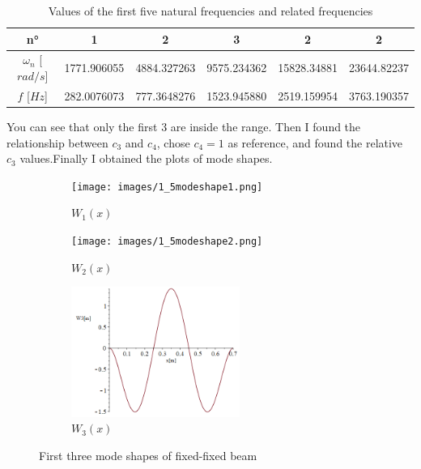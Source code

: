 \documentclass[11pt,a4paper]{article}
\begin{document}
\begin{enumerate}
	\begin{table}[H]
		\centering
		\begin{tabular}{c c c c c c} 
			\toprule
			\textbf{n°} & \textbf{1} & \textbf{2} & \textbf{3} & \textbf{2} & \textbf{2} \\
			\midrule	    		   	    		
			$\omega_n$ [$rad/s$] & 1771.906055 & 4884.327263 & 9575.234362 & 15828.34881 & 23644.82237 \\
			\midrule	    		
			$f$ [$Hz$]  & 282.0076073 & 777.3648276 & 1523.945880 & 2519.159954 & 3763.190357 \\	    		   
			\bottomrule
		\end{tabular}
		\caption{Values of the first five natural frequencies and related frequencies}
	\end{table}

	You can see that only the first 3 are inside the range. Then I found the relationship between $c_3$ and $c_4$, chose $c_4=1$ as reference, and found the relative $c_3$ values.Finally I obtained the plots of mode shapes.
	
	\begin{figure}[H]
		\centering
		\begin{subfigure}[b]{0.3\textwidth}
			\centering
			\texttt{[image: images/1\_5modeshape1.png]}
			\caption{$W_1(x)$}
		\end{subfigure}
		\hfill
		\begin{subfigure}[b]{0.3\textwidth}
			\centering
			\texttt{[image: images/1\_5modeshape2.png]}
			\caption{$W_2(x)$}
		\end{subfigure}
		\hfill
		\begin{subfigure}[b]{0.3\textwidth}
			\centering
			\includegraphics[width=55mm]{images/1_5modeshape3.png}
			\caption{$W_3(x)$}
		\end{subfigure}
		\caption{First three mode shapes of fixed-fixed beam}
	\end{figure}
	
	
\end{enumerate}			

\newpage
\end{document}
